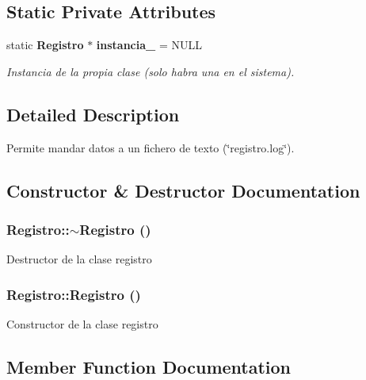 \subsection*{Static Private Attributes}
\begin{CompactItemize}
\item 
static {\bf Registro} $\ast$ {\bf instancia\_\-} = NULL
\begin{CompactList}\small\item\em Instancia de la propia clase (solo habra una en el sistema). \item\end{CompactList}\end{CompactItemize}


\subsection{Detailed Description}
Permite mandar datos a un fichero de texto (\char`\"{}registro.log\char`\"{}). 



\subsection{Constructor \& Destructor Documentation}
\subsubsection{\setlength{\rightskip}{0pt plus 5cm}Registro::$\sim$Registro ()}\label{classRegistro_1a61913f579e4c46512658085048dc7f}


Destructor de la clase registro 
\subsubsection{\setlength{\rightskip}{0pt plus 5cm}Registro::Registro ()\hspace{0.3cm}{\tt  [private]}}\label{classRegistro_79db13a112d147d186e0377c3284b735}


Constructor de la clase registro 

\subsection{Member Function Documentation}
